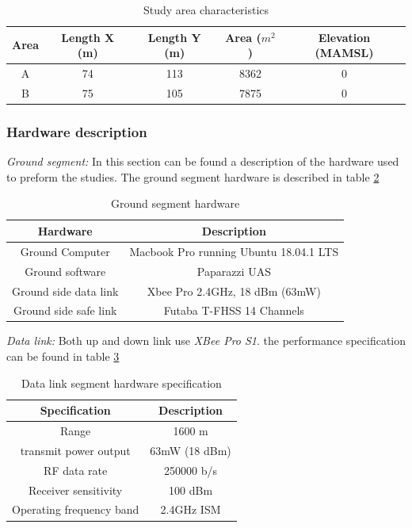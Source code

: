 \begin{table}[H]
\centering
\begin{tabular}{|c|c|c|c|c|}
\hline
Area & Length X (m) & Length Y (m) & Area ($m^2$) & Elevation (MAMSL) \\ \hline
A     & 74           & 113         &  8362     & 0                 \\ \hline
B     & 75           & 105          & 7875      & 0                 \\ \hline
\end{tabular}
\caption{Study area characteristics}
\label{table: Area_char}
\end{table}
\subsubsection{Hardware description}
\textit{Ground segment:}
In this section can be found a description of the hardware used to preform the studies.
The ground segment hardware is described in table \ref{Table:Ground_Hardware}
\begin{table}[H]
\centering
\begin{tabular}{|c|c|}
\hline
Hardware             & Description                            \\ \hline
Ground Computer      & Macbook Pro running Ubuntu 18.04.1 LTS \\ \hline
Ground software      & Paparazzi UAS                          \\ \hline
Ground side data link & Xbee Pro 2.4GHz, 18 dBm (63mW)         \\ \hline
Ground side safe link  & Futaba T-FHSS 14 Channels               \\ \hline
\end{tabular}
\caption{Ground segment hardware}
\label{Table:Ground_Hardware}
\end{table}


\textit{Data link:}
Both up and down link use \textit{XBee Pro S1}. the performance specification can be found in table \ref{Table:XBee}
\begin{table}[H]
\centering
\begin{tabular}{|c|c|}
\hline
Specification           & Description   \\ \hline
Range                    & 1600 m        \\ \hline
transmit power output    & 63mW (18 dBm) \\ \hline
RF data rate             & 250000 b/s    \\ \hline
Receiver sensitivity     & 100 dBm       \\ \hline
Operating frequency band & 2.4GHz ISM    \\ \hline
\end{tabular}
\caption{Data link segment hardware specification}
\label{Table:XBee}
\end{table}


